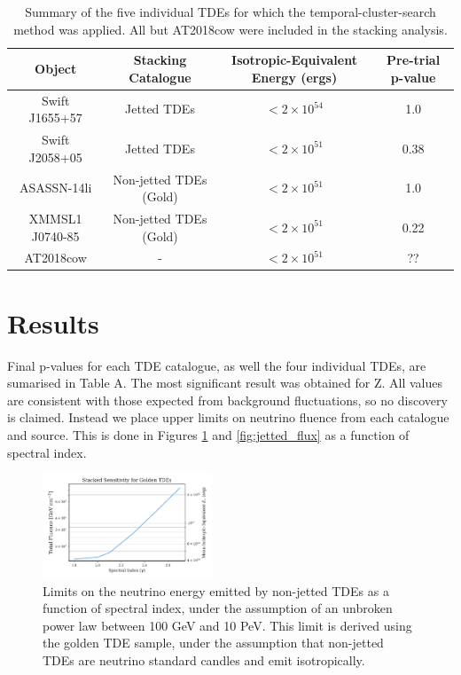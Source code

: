 \documentclass[twocolumn, tighten, linenumbers]{aastex62}
\begin{document}
\begin{table}[]
	\centering
	\begin{tabular}{||c c c| c |} 
		\hline
		Object & Stacking Catalogue &  Isotropic-Equivalent Energy (ergs) & Pre-trial p-value\\ [0.5ex] 
		\hline\hline
		Swift J1655+57 & Jetted TDEs & $<2 \times 10^{54}$ & 1.0\\ 
		\hline
		Swift J2058+05 & Jetted TDEs & $<2 \times 10^{51}$& 0.38\\
		\hline
		ASASSN-14li & Non-jetted TDEs (Gold) & $<2 \times 10^{51}$& 1.0\\
		\hline
		XMMSL1 J0740-85 & Non-jetted TDEs (Gold)& $<2 \times 10^{51}$ & 0.22\\
		\hline
		\hline
		AT2018cow & - & $<2 \times 10^{51}$& ??\\
		[1ex] 
		\hline
	\end{tabular}
	\caption{Summary of the five individual TDEs for which the temporal-cluster-search method was applied. All but AT2018cow were included in the stacking analysis.}
	\label{tab:single_tests}
\end{table}{}

\section{Results}
\label{sec:Results}
Final p-values for each TDE catalogue, as well the four individual TDEs, are sumarised in Table A. The most significant result was obtained for Z. All values are consistent with those expected from background fluctuations, so no discovery is claimed. Instead we place upper limits on neutrino fluence from each catalogue and source. This is done in Figures \ref{fig:gold_flux} and \ref{fig:jetted_flux}  as a function of spectral index.

\begin{figure}[!ht]
	\centering \includegraphics[width=0.45\textwidth]{figures/gold_flux}
	\caption{Limits on the neutrino energy emitted by non-jetted TDEs as a function of spectral index, under the assumption of an unbroken power law between 100 GeV and 10 PeV. This limit is derived using the golden TDE sample, under the assumption that non-jetted TDEs are neutrino standard candles and emit isotropically.}
	\label{fig:gold_flux}
\end{figure}
\end{document}
